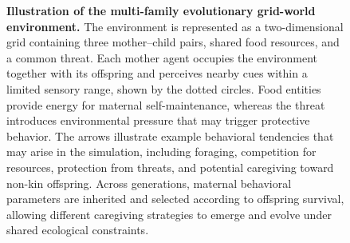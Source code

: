 \begin{figure}[H]
\caption{\textbf{Illustration of the multi-family evolutionary grid-world environment.} 
The environment is represented as a two-dimensional grid containing three mother--child pairs, shared food resources, and a common threat. 
Each mother agent occupies the environment together with its offspring and perceives nearby cues within a limited sensory range, shown by the dotted circles. 
Food entities provide energy for maternal self-maintenance, whereas the threat introduces environmental pressure that may trigger protective behavior. 
The arrows illustrate example behavioral tendencies that may arise in the simulation, including foraging, competition for resources, protection from threats, and potential caregiving toward non-kin offspring. 
Across generations, maternal behavioral parameters are inherited and selected according to offspring survival, allowing different caregiving strategies to emerge and evolve under shared ecological constraints.}
\label{fig:gridworld_multifamily}
\end{figure}